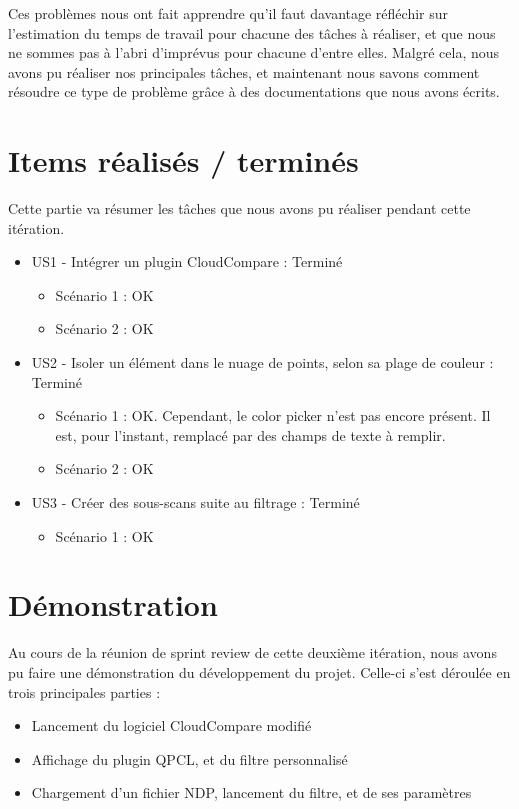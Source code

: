\documentclass[12pt,titlepage,french]{article}
\begin{document}
Ces problèmes nous ont fait apprendre qu'il faut davantage réfléchir sur l'estimation du temps de travail pour chacune des tâches à réaliser, et que nous ne sommes pas à l'abri d'imprévus pour chacune d'entre elles. Malgré cela, nous avons pu réaliser nos principales tâches, et maintenant nous savons comment résoudre ce type de problème grâce à des documentations que nous avons écrits.

\section{Items réalisés / terminés\label{US}}

Cette partie va résumer les tâches que nous avons pu réaliser pendant cette itération.

\begin{itemize}
  \item US1 - Intégrer un plugin CloudCompare : Terminé
  \begin{itemize}
    \item Scénario 1 : OK
    \item Scénario 2 : OK
  \end{itemize}
  \item US2 - Isoler un élément dans le nuage de points, selon sa plage de couleur : Terminé
  \begin{itemize}
    \item Scénario 1 : OK. Cependant, le color picker n'est pas encore présent. Il est, pour l'instant, remplacé par des champs de texte à remplir.
    \item Scénario 2 : OK
  \end{itemize}
  \item US3 - Créer des sous-scans suite au filtrage : Terminé
  \begin{itemize}
    \item Scénario 1 : OK
  \end{itemize}
\end{itemize}

\section{Démonstration}

Au cours de la réunion de sprint review de cette deuxième itération, nous avons pu faire une démonstration du développement du projet. Celle-ci s'est déroulée en trois principales parties :

\begin{itemize}
  \item Lancement du logiciel CloudCompare modifié
  \item Affichage du plugin QPCL, et du filtre personnalisé
  \item Chargement d'un fichier NDP, lancement du filtre, et de ses paramètres
\end{itemize}
\end{document}
